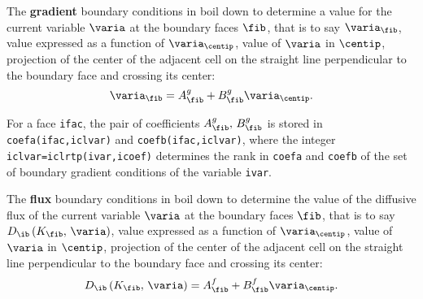 {{{







The \textbf{gradient} boundary conditions in \CS boil down to determine a value for the
current variable $\varia$ at the boundary faces $\fib$, that is to say $\varia_\fib$,
value expressed as a function of $\varia_{\centip}$, value of $\varia$ in $\centip$,
projection of the center of the adjacent cell on the straight line
perpendicular to the boundary face and crossing its center:
\begin{equation}
\varia_\fib=A_{\fib}^g +B_{\fib}^g \varia_{\centip}.
\end{equation}

For a face \texttt{ifac}, the pair of coefficients $A_{\fib}^g , \, B_{\fib}^g$ is
stored in \texttt{coefa(ifac,iclvar)} and
\texttt{coefb(ifac,iclvar)}, where the integer \texttt{iclvar=iclrtp(ivar,icoef)}
determines the rank in \texttt{coefa} and \texttt{coefb} of the set of boundary
gradient conditions of the variable \texttt{ivar}.

The \textbf{flux} boundary conditions in \CS boil down to determine the value of the diffusive
flux of the
current variable $\varia$ at the boundary faces $\fib$, that is to say
 $D_{\ib} \left(K_\fib, \, \varia \right)$,
value expressed as a function of $\varia_{\centip}$, value of $\varia$ in $\centip$,
projection of the center of the adjacent cell on the straight line
perpendicular to the boundary face and crossing its center:
\begin{equation}
D_{\ib} \left(K_\fib, \, \varia \right) = A_{\fib}^f +B_{\fib}^f \varia_{\centip}.
\end{equation}

}}}
